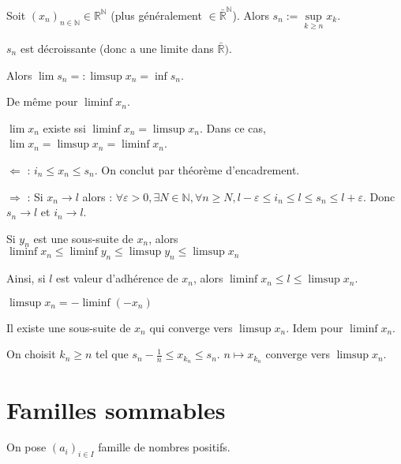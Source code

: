 \documentclass[10pt,a4paper,notitlepage ]{report}
\begin{document}
\begin{definition}
	
Soit $(x_n)_{n\in\mathbb N} \in \mathbb R ^\mathbb N$ (plus généralement $\in\bar{\mathbb R}^\mathbb N$). Alors $s_n := \underset{k\geq n}{\sup} x_k$.

$s_n$ est décroissante (donc a une limite dans $\bar{\mathbb R})$.

Alors $\lim s_n =: \limsup x_n = \inf s_n$.

De même pour $\liminf x_n$. 
\end{definition}
\begin{propriete}
	$\lim x_n$ existe ssi $\liminf x_n = \limsup x_n$. Dans ce cas, $\lim x_n = \limsup x_n = \liminf x_n$.
\end{propriete}

\begin{demo}
	$\Leftarrow$ : $i_n \leq x_n \leq s_n$. On conclut par théorème d'encadrement.
	
	$\Rightarrow$ : Si $x_n \rightarrow l$ alors : $\forall \varepsilon > 0, \exists N \in \mathbb N, \forall n \geq N, l-\varepsilon \leq i_n \leq l \leq s_n \leq l+\varepsilon$.
	Donc $s_n \rightarrow l$ et $i_n \rightarrow l$.
\end{demo}

\begin{propriete}
	Si $y_n$ est une sous-suite de $x_n$, alors $\liminf x_n \le \liminf y_n \le \limsup y_n \le \limsup x_n$
\end{propriete}

Ainsi, si $l$ est valeur d'adhérence de $x_n$, alors $\liminf x_n \le l \le \limsup x_n$.
\begin{propriete}
	$\limsup x_n = -\liminf (-x_n)$
\end{propriete}

\begin{propriete}
	Il existe une sous-suite de $x_n$ qui converge vers $\limsup x_n$. Idem pour $\liminf x_n$.
\end{propriete}
\begin{demo}
	On choisit $k_n \ge n$ tel que $s_n - \frac{1}{n} \le x_{k_n} \le s_n$. $n \mapsto x_{k_n}$ converge vers $\limsup x_n$.
\end{demo}

\section{Familles sommables}

On pose $(a_i)_{i\in I}$ famille de nombres positifs.
\end{document}
